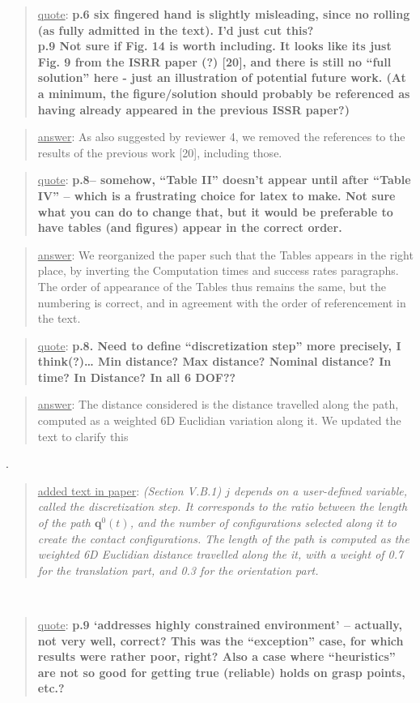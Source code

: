 \documentclass[a4paper]{article}
\newcommand{\done}[0]{}
\newcommand\quot[1]{\begin{quote} \underline{quote}: \textbf{#1}\end{quote}}
\newcommand\as[1]{\begin{quote} \underline{answer}: {#1}\end{quote} }
\newcommand\qt[1]{\begin{quote} \underline{added text in paper}: \textit{#1}\end{quote} \leavevmode \\ }
\begin{document}
\quot{
p.6 six fingered hand is slightly misleading, since no rolling (as fully admitted in the text). I'd just cut this? \\
p.9 Not sure if Fig. 14 is worth including. It looks like its just Fig. 9 from the ISRR paper (?) [20], and there is still no ``full solution'' here -
 just an illustration of potential future work. 
 (At a minimum, the figure/solution should probably be referenced as having already appeared in the previous ISSR paper?)
}

\as{As also suggested by reviewer 4, we removed the references to the results of the previous work [20], including those.}\done

\quot{
p.8– somehow, “Table II” doesn’t appear until after “Table IV” – which is a frustrating choice for latex to make. Not sure what you can do to change that, but it would be preferable to have tables (and figures) appear in the correct order.
}

\as{We reorganized the paper such that the Tables appears in the right place, by inverting the Computation times and success rates paragraphs. The order of appearance of the Tables thus remains
the same, but the numbering is correct, and in agreement with the order of referencement in the text.}\done

\quot{
p.8. Need to define ``discretization step'' more precisely, I think(?)… Min distance? Max distance? Nominal distance? In time? In Distance? In all 6 DOF??
}

\as{The distance considered is the distance travelled along the path, computed as a weighted 6D Euclidian variation along it. We updated the text to clarify this}.
\qt{(Section V.B.1) $j$ depends on a user-defined variable, called the discretization step. It corresponds to the ratio between the length of the path $\mathbf{q}^0(t)$, and the number
of configurations selected along it to create the contact configurations. The length of the path is computed as the weighted 6D Euclidian distance
travelled along the it, with a weight of 0.7 for the translation part, and 0.3
for the orientation part.}

\quot{
p.9 ‘addresses highly constrained environment’ – actually, not very well, correct? This was the “exception” case, for which results were rather poor, right? Also a case where “heuristics” are not so good for getting true (reliable) holds on grasp points, etc.?
}
\end{document}
